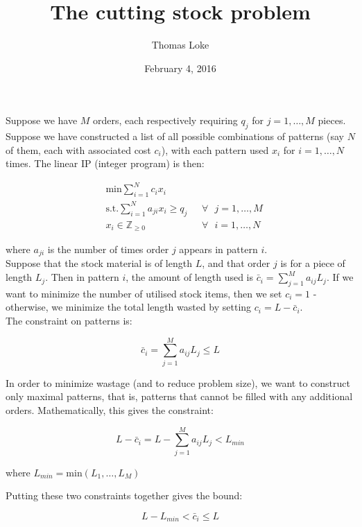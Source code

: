 \documentclass[12pt, a4paper]{article}
\title{\textbf{The cutting stock problem}}
\author{Thomas Loke}
\date{February 4, 2016}
\begin{document}
\maketitle

Suppose we have $M$ orders, each respectively requiring $q_j$ for $j = 1,\ldots,M$ pieces. Suppose we have constructed a list of all possible combinations of patterns (say $N$ of them, each with associated cost $c_i$), with each pattern used $x_i$ for $i = 1,\ldots,N$ times. The linear IP (integer program) is then:

\begin{eqnarray}
& \mbox{min} \displaystyle\sum_{i=1}^{N} c_i x_i & \\
& \mbox{s.t.} \displaystyle\sum_{i=1}^{N} a_{ji} x_i \geq q_j \mbox{  } & \forall \mbox{ } j = 1,\ldots,M \\
& x_i \in \mathbb{Z}_{\geq 0} & \forall \mbox{ } i = 1,\ldots,N
\end{eqnarray}

where $a_{ji}$ is the number of times order $j$ appears in pattern $i$. \\

Suppose that the stock material is of length $L$, and that order $j$ is for a piece of length $L_j$. Then in pattern $i$, the amount of length used is $ \bar{c}_i = \displaystyle\sum_{j=1}^{M} a_{ij} L_j $. If we want to minimize the number of utilised stock items, then we set $c_i = 1$ - otherwise, we minimize the total length wasted by setting $c_i = L - \bar{c}_i$. \\

The constraint on patterns is:

\begin{equation}
\bar{c}_i = \displaystyle\sum_{j=1}^{M} a_{ij} L_j \leq L
\end{equation}

In order to minimize wastage (and to reduce problem size), we want to construct only maximal patterns, that is, patterns that cannot be filled with any additional orders. Mathematically, this gives the constraint:

\begin{equation}
L - \bar{c}_i = L - \displaystyle\sum_{j=1}^{M} a_{ij} L_j < L_{min}
\end{equation}

where $L_{min} = \mbox{min}(L_1,\ldots,L_M) $

Putting these two constraints together gives the bound:

\begin{equation}
L - L_{min} < \bar{c}_i \leq L
\end{equation}
\end{document}
